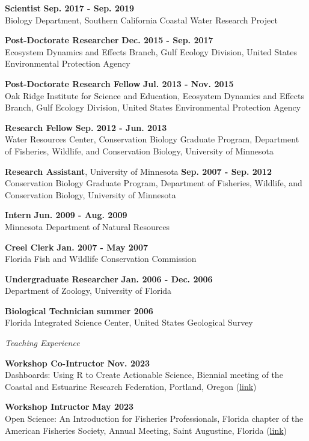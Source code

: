\documentclass[letterpaper,12pt]{article}
\newcommand{\sectitle}[1]{\vspace{\baselineskip} \centerline{\large{\textit{#1}}}}
\begin{document}
{\bf Scientist} \hfill {\bf Sep. 2017 - Sep. 2019}\\
Biology Department, Southern California Coastal Water Research Project

{\bf Post-Doctorate Researcher} \hfill {\bf Dec. 2015 - Sep. 2017}\\
Ecosystem Dynamics and Effects Branch, Gulf Ecology Division, United States Environmental Protection Agency

{\bf Post-Doctorate Research Fellow} \hfill {\bf Jul. 2013 - Nov. 2015}\\
Oak Ridge Institute for Science and Education, Ecosystem Dynamics and Effects Branch, Gulf Ecology Division, United States Environmental Protection Agency

{\bf Research Fellow} \hfill {\bf Sep. 2012 - Jun. 2013} \\
Water Resources Center, Conservation Biology Graduate Program, Department of Fisheries, Wildlife, and Conservation Biology, University of Minnesota

{\bf Research Assistant}, University of Minnesota \hfill {\bf Sep. 2007 - Sep. 2012} \\
Conservation Biology Graduate Program, Department of Fisheries, Wildlife, and Conservation Biology, University of Minnesota

{\bf Intern} \hfill {\bf Jun. 2009 - Aug. 2009} \\
Minnesota Department of Natural Resources

{\bf Creel Clerk} \hfill {\bf Jan. 2007 - May 2007} \\
Florida Fish and Wildlife Conservation Commission

{\bf Undergraduate Researcher} \hfill {\bf Jan. 2006 - Dec. 2006} \\
Department of Zoology, University of Florida

{\bf Biological Technician} \hfill {\bf summer 2006} \\
Florida Integrated Science Center, United States Geological Survey

\sectitle{Teaching Experience}

{\bf Workshop Co-Intructor} \hfill {\bf Nov. 2023}\\
Dashboards: Using R to Create Actionable Science, Biennial meeting of the Coastal and Estuarine Research Federation, Portland, Oregon ({\footnotesize\href{https://tbep-tech.github.io/shiny-workshop/}{link}})

{\bf Workshop Intructor} \hfill {\bf May 2023}\\
Open Science: An Introduction for Fisheries Professionals, Florida chapter of the American Fisheries Society, Annual Meeting, Saint Augustine, Florida ({\footnotesize\href{https://tbep-tech.github.io/flafs-os-workshop/}{link}})
\end{document}
